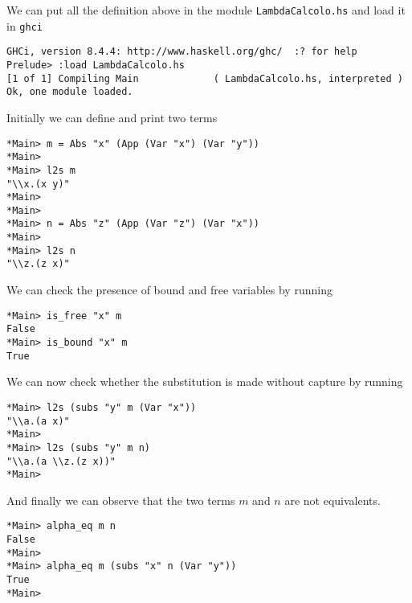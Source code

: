 \documentclass[a4paper,11pt]{article}
\theoremstyle{definition}
\begin{document}
We can put all the definition above in the module \texttt{LambdaCalcolo.hs}
and load it in \texttt{ghci} 
\begin{verbatim}
GHCi, version 8.4.4: http://www.haskell.org/ghc/  :? for help
Prelude> :load LambdaCalcolo.hs 
[1 of 1] Compiling Main             ( LambdaCalcolo.hs, interpreted )
Ok, one module loaded.
\end{verbatim}

Initially we can define and print two terms
\begin{verbatim}
*Main> m = Abs "x" (App (Var "x") (Var "y"))
*Main> 
*Main> l2s m
"\\x.(x y)"
*Main> 
*Main> 
*Main> n = Abs "z" (App (Var "z") (Var "x"))
*Main> 
*Main> l2s n
"\\z.(z x)"
\end{verbatim}

We can check the presence of bound and free variables by running
\begin{verbatim}
*Main> is_free "x" m
False
*Main> is_bound "x" m
True
\end{verbatim}

We can now check whether the substitution is made without capture by running
\begin{verbatim}
*Main> l2s (subs "y" m (Var "x"))
"\\a.(a x)"
*Main>
*Main> l2s (subs "y" m n)
"\\a.(a \\z.(z x))"
*Main>
\end{verbatim}

And finally we can observe that the two terms $m$ and $n$ are not
equivalents.
\begin{verbatim}
*Main> alpha_eq m n
False
*Main>
*Main> alpha_eq m (subs "x" n (Var "y"))
True
*Main> 
\end{verbatim}
\printbibliography
\end{document}
